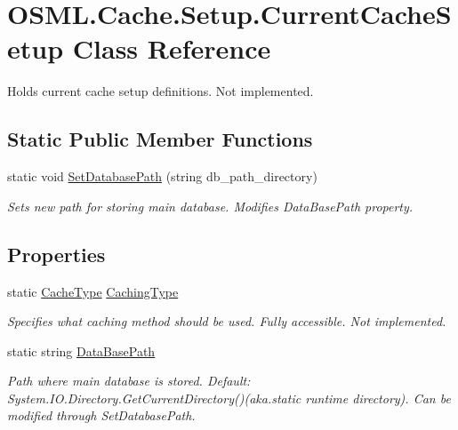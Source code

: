\hypertarget{classOSML_1_1Cache_1_1Setup_1_1CurrentCacheSetup}{}\section{O\+S\+M\+L.\+Cache.\+Setup.\+Current\+Cache\+Setup Class Reference}
\label{classOSML_1_1Cache_1_1Setup_1_1CurrentCacheSetup}


Holds current cache setup definitions. Not implemented.  


\subsection*{Static Public Member Functions}
\begin{DoxyCompactItemize}
\item 
static void \mbox{\hyperlink{classOSML_1_1Cache_1_1Setup_1_1CurrentCacheSetup_a83ae9cf7c7e5c3edfa4375bc8c3f4f76}{Set\+Database\+Path}} (string db\+\_\+path\+\_\+directory)
\begin{DoxyCompactList}\small\item\em Sets new path for storing main database. Modifies Data\+Base\+Path property. \end{DoxyCompactList}\end{DoxyCompactItemize}
\subsection*{Properties}
\begin{DoxyCompactItemize}
\item 
static \mbox{\hyperlink{namespaceOSML_1_1Cache_1_1Setup_abdb98825a257abbcae6c186d8ba7a088}{Cache\+Type}} \mbox{\hyperlink{classOSML_1_1Cache_1_1Setup_1_1CurrentCacheSetup_a3e5c536b009ba38125bb2605ef2071d3}{Caching\+Type}}
\begin{DoxyCompactList}\small\item\em Specifies what caching method should be used. Fully accessible. Not implemented. \end{DoxyCompactList}\item 
static string \mbox{\hyperlink{classOSML_1_1Cache_1_1Setup_1_1CurrentCacheSetup_a1eff786a11c1515e84ff7195b72bdffa}{Data\+Base\+Path}}
\begin{DoxyCompactList}\small\item\em Path where main database is stored. Default\+: System.\+I\+O.\+Directory.\+Get\+Current\+Directory()(aka.\+static runtime directory). Can be modified through Set\+Database\+Path. \end{DoxyCompactList}\end{DoxyCompactItemize}



